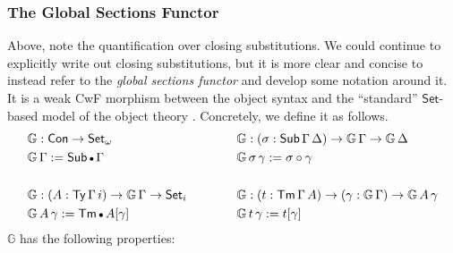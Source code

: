 \documentclass[acmsmall,screen,review,anonymous]{acmart}
\newcommand{\msf}[1]{{\mathsf{#1}}}
\newcommand{\mbb}[1]{\mathbb{#1}}
\newcommand{\Set}{\msf{Set}}
\newcommand{\emptycon}{\scaleobj{.75}\bullet}
\newcommand{\Con}{\msf{Con}}
\newcommand{\Sub}{\msf{Sub}}
\newcommand{\Ty}{\msf{Ty}}
\newcommand{\Tm}{\msf{Tm}}
\newcommand{\G}{\mbb{G}}
\begin{document}
\subsubsection{The Global Sections Functor}

Above, note the quantification over closing substitutions. We could continue to explicitly write out
closing substitutions, but it is more clear and concise to instead refer to the \emph{global
sections functor} and develop some notation around it. It is a weak CwF morphism between the object
syntax and the ``standard'' $\Set$-based model of the object theory \cite{TODO}. Concretely, we define
it as follows.
\begin{alignat*}{3}
  &\G : \Con \to \Set_\omega                                        &&\G : (\sigma : \Sub\,\Gamma\,\Delta) \to \G\,\Gamma \to \G\,\Delta\\
  &\G\,\Gamma := \Sub\,\emptycon\,\Gamma                           &&\G\,\sigma\,\gamma := \sigma \circ \gamma \\
  & &&\\
  &\G : (A : \Ty\,\Gamma\,i) \to \G\,\Gamma \to \Set_i\hspace{3em} &&\G : (t : \Tm\,\Gamma\,A) \to (\gamma : \G\,\Gamma) \to \G\,A\,\gamma\\
  &\G\,A\,\gamma := \Tm\,\emptycon\,A[\gamma]                      && \G\,t\,\gamma := t[\gamma]
\end{alignat*}
$\G$ has the following properties:
\end{document}
